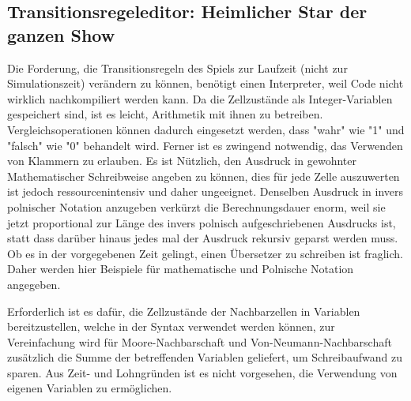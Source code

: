 \documentclass[11pt,a4paper]{article}
\begin{document}
    \pagebreak
    
\subsubsection{}


\subsection{Transitionsregeleditor: Heimlicher Star der ganzen Show}
Die Forderung, die Transitionsregeln des Spiels zur Laufzeit (nicht zur Simulationszeit) verändern zu können, benötigt einen Interpreter, weil Code nicht wirklich nachkompiliert werden kann.
Da die Zellzustände als Integer-Variablen gespeichert sind, ist es leicht, Arithmetik mit ihnen zu betreiben. Vergleichsoperationen können dadurch eingesetzt werden, dass "wahr" wie "1" und "falsch" wie "0" behandelt wird. Ferner ist es zwingend notwendig, das Verwenden von Klammern zu erlauben. Es ist Nützlich, den Ausdruck in gewohnter Mathematischer Schreibweise angeben zu können, dies für jede Zelle auszuwerten ist jedoch ressourcenintensiv und daher ungeeignet. Denselben Ausdruck in invers polnischer Notation anzugeben verkürzt die Berechnungsdauer enorm, weil sie jetzt proportional zur Länge des invers polnisch aufgeschriebenen Ausdrucks ist, statt dass darüber hinaus jedes mal der Ausdruck rekursiv geparst werden muss.
Ob es in der vorgegebenen Zeit gelingt, einen Übersetzer zu schreiben ist fraglich. Daher werden hier Beispiele für mathematische und Polnische Notation angegeben.

Erforderlich ist es dafür, die Zellzustände der Nachbarzellen in Variablen bereitzustellen, welche in der Syntax verwendet werden können, zur Vereinfachung wird für Moore-Nachbarschaft und Von-Neumann-Nachbarschaft zusätzlich die Summe der betreffenden Variablen geliefert, um Schreibaufwand zu sparen. Aus Zeit- und Lohngründen ist es nicht vorgesehen, die Verwendung von eigenen Variablen zu ermöglichen. 
\end{document}
